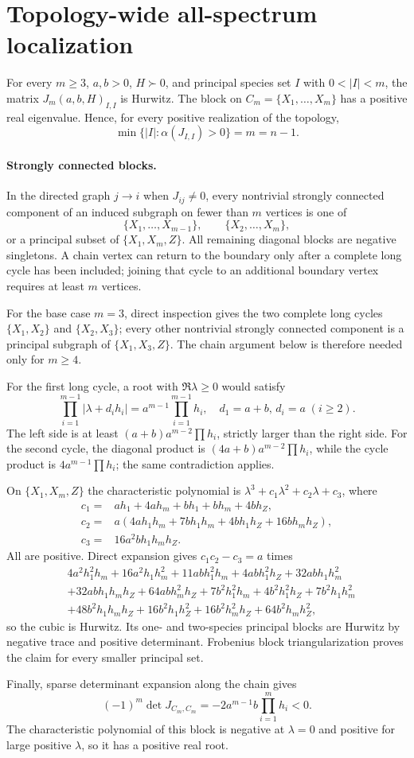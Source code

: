 \section*{Topology-wide all-spectrum localization}
\begin{theorem}
For every $m\geq3$, $a,b>0$, $H\succ0$, and principal species set $I$ with
$0<|I|<m$, the matrix $J_m(a,b,H)_{I,I}$ is Hurwitz.  The block on
$C_m=\{X_1,\ldots,X_m\}$ has a positive real eigenvalue.  Hence, for every
positive realization of the topology,
\[
\min\{|I|:\alpha(J_{I,I})>0\}=m=n-1.
\]
\end{theorem}

\paragraph{Strongly connected blocks.}
In the directed graph $j\to i$ when $J_{ij}\neq0$, every nontrivial strongly
connected component of an induced subgraph on fewer than $m$ vertices is one
of
\[
\{X_1,\ldots,X_{m-1}\},\qquad
\{X_2,\ldots,X_m\},
\]
or a principal subset of $\{X_1,X_m,Z\}$.  All remaining diagonal blocks are
negative singletons.  A chain vertex can return to the boundary only after a
complete long cycle has been included; joining that cycle to an additional
boundary vertex requires at least $m$ vertices.

For the base case $m=3$, direct inspection gives the two complete long cycles
$\{X_1,X_2\}$ and $\{X_2,X_3\}$; every other nontrivial strongly connected
component is a principal subgraph of $\{X_1,X_3,Z\}$.  The chain argument
below is therefore needed only for $m\ge4$.

For the first long cycle, a root with $\Re\lambda\geq0$ would satisfy
\[
\prod_{i=1}^{m-1}|\lambda+d_i h_i|
 =a^{m-1}\prod_{i=1}^{m-1}h_i,
\quad d_1=a+b,\,d_i=a\;(i\ge2).
\]
The left side is at least $(a+b)a^{m-2}\prod h_i$, strictly larger than the
right side.  For the second cycle, the diagonal product is
$(4a+b)a^{m-2}\prod h_i$, while the cycle product is
$4a^{m-1}\prod h_i$; the same contradiction applies.

On $\{X_1,X_m,Z\}$ the characteristic polynomial is
$\lambda^3+c_1\lambda^2+c_2\lambda+c_3$, where
\begin{align*}
c_1={}&ah_1+4ah_m+bh_1+bh_m+4bh_Z,\\
c_2={}&a(4ah_1h_m+7bh_1h_m+4bh_1h_Z+16bh_mh_Z),\\
c_3={}&16a^2bh_1h_mh_Z.
\end{align*}
All are positive.  Direct expansion gives $c_1c_2-c_3=a$ times
\begin{align*}
&4a^2h_1^2h_m+16a^2h_1h_m^2+11abh_1^2h_m+4abh_1^2h_Z
+32abh_1h_m^2\\
&+32abh_1h_mh_Z+64abh_m^2h_Z+7b^2h_1^2h_m+4b^2h_1^2h_Z
+7b^2h_1h_m^2\\
&+48b^2h_1h_mh_Z+16b^2h_1h_Z^2+16b^2h_m^2h_Z
+64b^2h_mh_Z^2,
\end{align*}
so the cubic is Hurwitz.  Its one- and two-species principal blocks are
Hurwitz by negative trace and positive determinant.  Frobenius block
triangularization proves the claim for every smaller principal set.

Finally, sparse determinant expansion along the chain gives
\[
(-1)^m\det J_{C_m,C_m}
=-2a^{m-1}b\prod_{i=1}^m h_i<0.
\]
The characteristic polynomial of this block is negative at $\lambda=0$ and
positive for large positive $\lambda$, so it has a positive real root.
